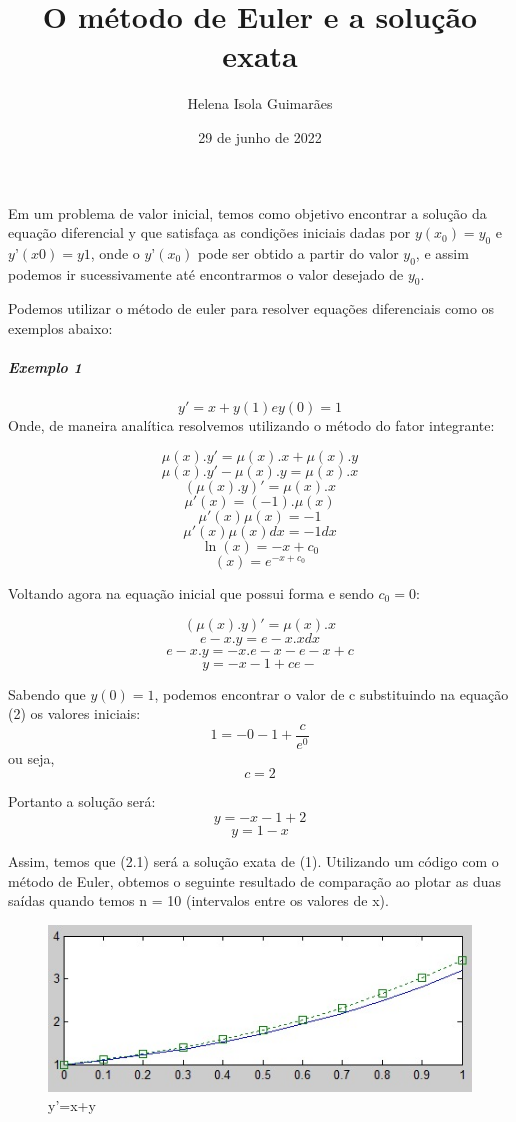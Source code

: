 \documentclass[]{article}
\title{O método de Euler e a solução exata}
\author{Helena Isola Guimarães}
\date{29 de junho de 2022}
\begin{document}
\maketitle
Em um problema de valor inicial, temos como objetivo encontrar a solução da equação diferencial y que 
satisfaça as condições iniciais dadas por $y(x_0)=y_0$ e $y’(x0)=y1$, onde o $y’(x_0)$ pode ser obtido a 
partir do valor $y_0$, e assim podemos ir sucessivamente até encontrarmos o valor desejado de $y_0$. 

Podemos utilizar o método de euler para resolver equações diferenciais como os exemplos abaixo:

\subparagraph*{Exemplo 1}
\begin{equation}
    y' = x + y  (1)  e  y(0) = 1
\end{equation}
Onde, de maneira analítica resolvemos utilizando o método do fator integrante:

\[\mu (x).y' = \mu (x).x + \mu (x).y\]
\[\mu (x).y' - \mu (x).y = \mu (x).x \]
\[(\mu (x).y)' = \mu (x).x\]
\[\mu '(x) =(-1). \mu (x)\]
\[\mu '(x)\mu (x) = -1\]
\[\mu '(x)\mu (x)dx = -1 dx\]
\[\ln (x) = -x +c_0\]
\[(x) = e^{-x+c_0}\]

Voltando agora na equação inicial que possui forma e sendo $c_0 = 0$:

\[(\mu (x).y)' = \mu (x).x\]
\[ e-x.y  = e-x.x dx \]
\[e-x.y  = -x.e-x - e-x+c\]
\[y = -x -1 + ce-\]

Sabendo que $y(0) = 1$, podemos encontrar o valor de c substituindo na equação (2) os valores iniciais:
\[1 = - 0 -1 + \frac{c}{e^0}\] 		
ou seja,  \[c = 2\]

Portanto a solução será:
\[y = -x -1 + 2 \]
\[y = 1 - x  \]

Assim, temos que (2.1) será a solução exata de (1). Utilizando um código com o método de Euler, obtemos o seguinte resultado de comparação ao plotar as duas saídas quando temos n = 10 (intervalos entre os valores de x).

\begin{figure}
    \includegraphics[width=\linewidth]{euler1.jpeg}
    \caption{y'=x+y}
    \label{fig:euler1}
\end{figure}
\end{document}
